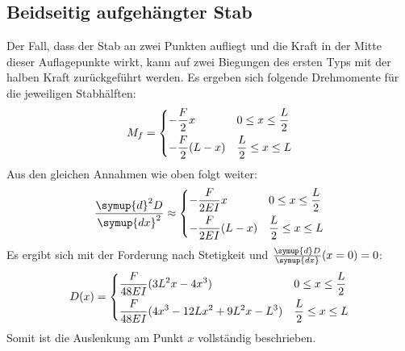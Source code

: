 \subsection{Beidseitig aufgehängter Stab}
Der Fall, dass der Stab an zwei Punkten aufliegt und die Kraft in der Mitte dieser
Auflagepunkte wirkt, kann auf zwei Biegungen des ersten Typs mit der halben Kraft zurückgeführt werden.
Es ergeben sich folgende Drehmomente für die jeweiligen Stabhälften:
\begin{align}
    M_f =
    \begin{dcases}
        -\frac{F}{2}x       & 0 \leq x \leq \frac{L}{2}\\
        -\frac{F}{2}(L-x)   & \frac{L}{2} \leq x \leq L
    \end{dcases}
\end{align}
Aus den gleichen Annahmen wie oben folgt weiter:
\begin{align}
    \frac{\symup{d}^2D}{\symup{dx}^2} \approx
    \begin{dcases}
        -\frac{F}{2EI} x     & 0 \leq x \leq \frac{L}{2}\\
        -\frac{F}{2EI} (L-x) & \frac{L}{2} \leq x \leq L
    \end{dcases}
\end{align}
Es ergibt sich mit der Forderung nach Stetigkeit und \mbox{$\frac{\symup{d}D}{\symup{dx}}(x=0) = 0$}:
\begin{equation}
    \label{eq:ausl}
    D(x) =
    \begin{dcases}
    \frac{F}{48EI}(3L^2x-4x^3) & 0 \leq x \leq \frac{L}{2}\\
    \frac{F}{48EI}(4x^3-12Lx^2+9L^2x -L^3) & \frac{L}{2} \leq x \leq L
    \end{dcases}
\end{equation}
Somit ist die Auslenkung am Punkt $x$ vollständig beschrieben.
